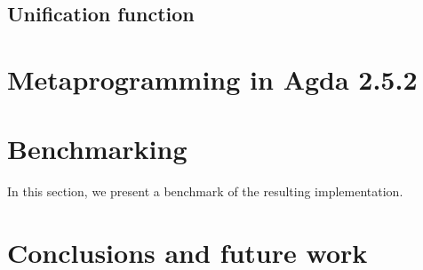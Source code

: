 \documentclass[12pt]{article}
\begin{document}
\subsection{Unification function}

\section{Metaprogramming in Agda 2.5.2}
\label{sec:Metaprogramming}


\section{Benchmarking}

In this section, we present a benchmark of the resulting implementation.

\section{Conclusions and future work}

\appendix



\end{document}
